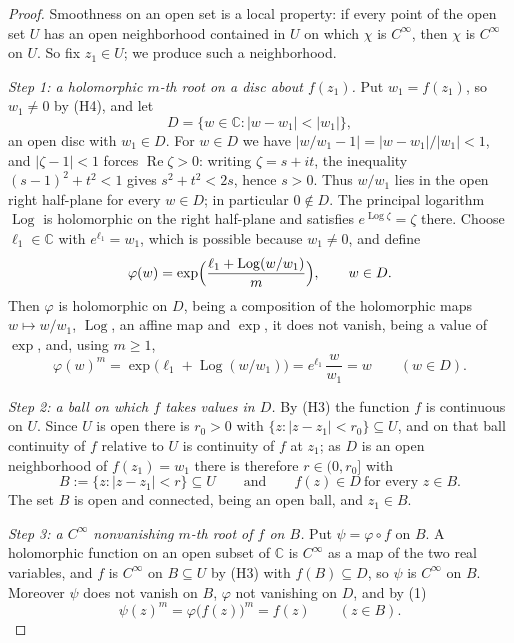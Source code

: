\begin{proof}
Smoothness on an open set is a local property: if every point of the open set
$U$ has an open neighborhood contained in $U$ on which $\chi$ is $C^\infty$,
then $\chi$ is $C^\infty$ on $U$.  So fix $z_1\in U$; we produce such a
neighborhood.

\emph{Step 1: a holomorphic $m$-th root on a disc about $f(z_1)$.}  Put
$w_1=f(z_1)$, so $w_1\neq0$ by (H4), and let
\[
  D=\{w\in\mathbb{C}:|w-w_1|<|w_1|\},
\]
an open disc with $w_1\in D$.  For $w\in D$ we have
$|w/w_1-1|=|w-w_1|/|w_1|<1$, and $|\zeta-1|<1$ forces
$\operatorname{Re}\zeta>0$: writing $\zeta=s+it$, the inequality
$(s-1)^2+t^2<1$ gives $s^2+t^2<2s$, hence $s>0$.  Thus $w/w_1$ lies in the
open right half-plane for every $w\in D$; in particular $0\notin D$.  The
principal logarithm $\operatorname{Log}$ is holomorphic on the right
half-plane and satisfies $e^{\operatorname{Log}\zeta}=\zeta$ there.  Choose
$\ell_1\in\mathbb{C}$ with $e^{\ell_1}=w_1$, which is possible because
$w_1\neq0$, and define
\[
  \varphi(w)=\exp\Bigl(\frac{\ell_1+\operatorname{Log}(w/w_1)}{m}\Bigr),
  \qquad w\in D .
\]
Then $\varphi$ is holomorphic on $D$, being a composition of the holomorphic
maps $w\mapsto w/w_1$, $\operatorname{Log}$, an affine map and $\exp$, it does
not vanish, being a value of $\exp$, and, using $m\ge1$,
\begin{equation}\tag{1}
  \varphi(w)^{m}=\exp\bigl(\ell_1+\operatorname{Log}(w/w_1)\bigr)
  =e^{\ell_1}\,\frac{w}{w_1}=w\qquad(w\in D).
\end{equation}

\emph{Step 2: a ball on which $f$ takes values in $D$.}  By (H3) the function
$f$ is continuous on $U$.  Since $U$ is open there is $r_0>0$ with
$\{z:|z-z_1|<r_0\}\subseteq U$, and on that ball continuity of $f$ relative to
$U$ is continuity of $f$ at $z_1$; as $D$ is an open neighborhood of
$f(z_1)=w_1$ there is therefore $r\in(0,r_0]$ with
\[
  B:=\{z:|z-z_1|<r\}\subseteq U\qquad\text{and}\qquad f(z)\in D
  \ \text{for every }z\in B .
\]
The set $B$ is open and connected, being an open ball, and $z_1\in B$.

\emph{Step 3: a $C^\infty$ nonvanishing $m$-th root of $f$ on $B$.}  Put
$\psi=\varphi\circ f$ on $B$.  A holomorphic function on an open subset of
$\mathbb{C}$ is $C^\infty$ as a map of the two real variables, and $f$ is
$C^\infty$ on $B\subseteq U$ by (H3) with $f(B)\subseteq D$, so $\psi$ is
$C^\infty$ on $B$.  Moreover $\psi$ does not vanish on $B$, $\varphi$ not
vanishing on $D$, and by (1)
\begin{equation}\tag{2}
  \psi(z)^{m}=\varphi\bigl(f(z)\bigr)^{m}=f(z)\qquad(z\in B).
\end{equation}


\end{proof}
